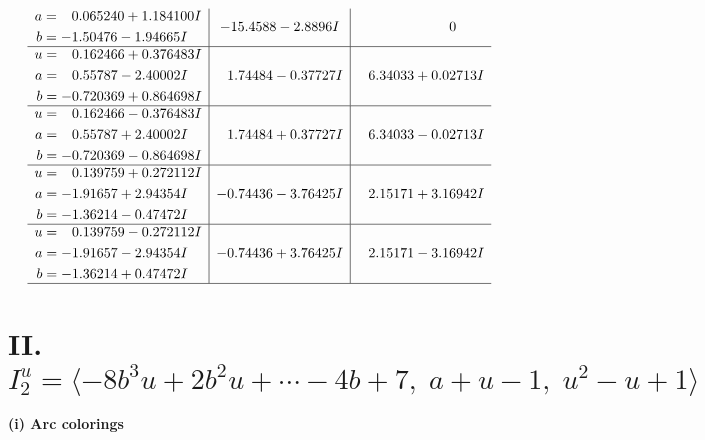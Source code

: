\documentclass[1p]{elsarticle_modified}
\theoremstyle{definition}
\begin{document}
$$\begin{array}{c|c|c}
\begin{aligned}
a &= \phantom{-}0.065240 + 1.184100 I \\
b &= -1.50476 - 1.94665 I\end{aligned}
 & -15.4588 - 2.8896 I & \phantom{-0.000000 } 0 \\ \hline\begin{aligned}
u &= \phantom{-}0.162466 + 0.376483 I \\
a &= \phantom{-}0.55787 - 2.40002 I \\
b &= -0.720369 + 0.864698 I\end{aligned}
 & \phantom{-}1.74484 - 0.37727 I & \phantom{-}6.34033 + 0.02713 I \\ \hline\begin{aligned}
u &= \phantom{-}0.162466 - 0.376483 I \\
a &= \phantom{-}0.55787 + 2.40002 I \\
b &= -0.720369 - 0.864698 I\end{aligned}
 & \phantom{-}1.74484 + 0.37727 I & \phantom{-}6.34033 - 0.02713 I \\ \hline\begin{aligned}
u &= \phantom{-}0.139759 + 0.272112 I \\
a &= -1.91657 + 2.94354 I \\
b &= -1.36214 - 0.47472 I\end{aligned}
 & -0.74436 - 3.76425 I & \phantom{-}2.15171 + 3.16942 I \\ \hline\begin{aligned}
u &= \phantom{-}0.139759 - 0.272112 I \\
a &= -1.91657 - 2.94354 I \\
b &= -1.36214 + 0.47472 I\end{aligned}
 & -0.74436 + 3.76425 I & \phantom{-}2.15171 - 3.16942 I\\
 \hline 
 \end{array}$$\newpage\newpage\renewcommand{\arraystretch}{1}
\centering \section*{II. $I^u_{2}= \langle -8 b^3 u+2 b^2 u+\cdots-4 b+7,\;a+u-1,\;u^2- u+1 \rangle$}
\flushleft \textbf{(i) Arc colorings}\\
\end{document}
